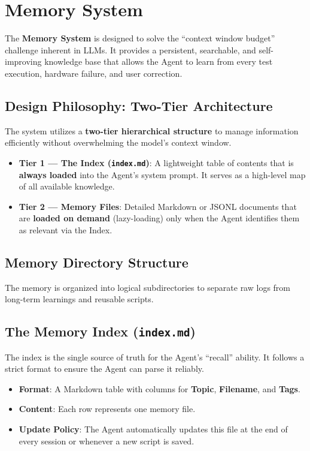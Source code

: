 \documentclass[conference]{IEEEtran}
\begin{document}
\section{Memory System}
The \textbf{Memory System} is designed to solve the ``context window budget'' challenge inherent in LLMs. It provides a persistent, searchable, and self-improving knowledge base that allows the Agent to learn from every test execution, hardware failure, and user correction.

\subsection{Design Philosophy: Two-Tier Architecture}
The system utilizes a \textbf{two-tier hierarchical structure} to manage information efficiently without overwhelming the model's context window.
\begin{itemize}
    \item \textbf{Tier 1 --- The Index (\texttt{index.md})}: A lightweight table of contents that is \textbf{always loaded} into the Agent's system prompt. It serves as a high-level map of all available knowledge.
    \item \textbf{Tier 2 --- Memory Files}: Detailed Markdown or JSONL documents that are \textbf{loaded on demand} (lazy-loading) only when the Agent identifies them as relevant via the Index.
\end{itemize}

\subsection{Memory Directory Structure}
The memory is organized into logical subdirectories to separate raw logs from long-term learnings and reusable scripts.

\subsection{The Memory Index (\texttt{index.md})}
The index is the single source of truth for the Agent's ``recall'' ability. It follows a strict format to ensure the Agent can parse it reliably.
\begin{itemize}
    \item \textbf{Format}: A Markdown table with columns for \textbf{Topic}, \textbf{Filename}, and \textbf{Tags}.
    \item \textbf{Content}: Each row represents one memory file.
    \item \textbf{Update Policy}: The Agent automatically updates this file at the end of every session or whenever a new script is saved.
\end{itemize}
\end{document}
